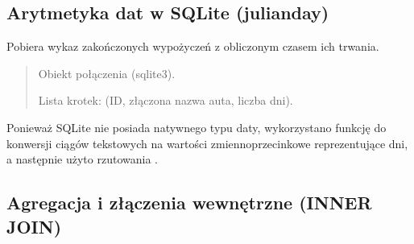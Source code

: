 \documentclass[a4paper,11pt,english,openany,oneside]{sphinxmanual}
\begin{document}
\subsection{Arytmetyka dat w SQLite (julianday)}
\label{\detokenize{rozdzial_5/index:arytmetyka-dat-w-sqlite-julianday}}

\begin{savenotes}\begin{fulllineitems}

\pysigstartsignatures
\pysiglinewithargsret
{}
{}
{}
\pysigstopsignatures
\sphinxAtStartPar
Pobiera wykaz zakończonych wypożyczeń z obliczonym czasem ich trwania.
\begin{quote}\begin{description}
\sphinxAtStartPar
{} \textendash{} Obiekt połączenia (sqlite3).

\sphinxAtStartPar
Lista krotek: (ID, złączona nazwa auta, liczba dni).

\end{description}\end{quote}

\sphinxAtStartPar
{} Ponieważ SQLite nie posiada natywnego typu daty, wykorzystano funkcję  do konwersji ciągów tekstowych na wartości zmiennoprzecinkowe reprezentujące dni, a następnie użyto rzutowania .

\end{fulllineitems}\end{savenotes}



\subsection{Agregacja i złączenia wewnętrzne (INNER JOIN)}
\label{\detokenize{rozdzial_5/index:agregacja-i-zlaczenia-wewnetrzne-inner-join}}
\end{document}
